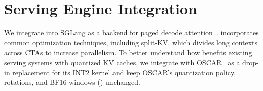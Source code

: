 \section{Serving Engine Integration}
\label{sec:serving}

We integrate \sys{} into SGLang as a backend for paged decode attention~\cite{zheng2024sglang}.
\sys{} incorporates common optimization techniques, including split-KV, which divides long contexts across CTAs to increase parallelism.
To better understand how \sys{} benefits existing serving systems with quantized KV caches, we integrate \sys{} with OSCAR~\cite{zhou2026oscar} as a drop-in replacement for its INT2 kernel and keep OSCAR's quantization policy, rotations, and BF16 windows () unchanged.
